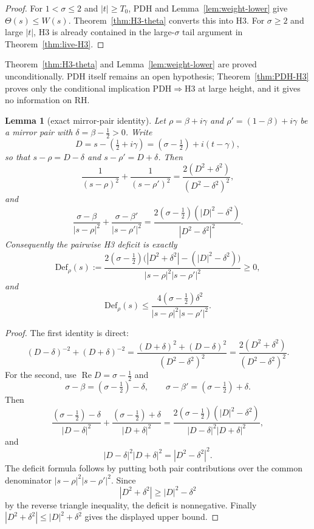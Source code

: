 \documentclass[11pt]{amsart}
\newtheorem{lemma}[theorem]{Lemma}
\theoremstyle{definition}
\theoremstyle{remark}
\theoremstyle{definition}
\renewcommand{\Re}{\operatorname{Re}}
\newcommand{\half}{\tfrac{1}{2}}
\begin{document}
\begin{proof}
For $1<\sigma\le2$ and $|t|\ge T_0$, PDH and Lemma~\ref{lem:weight-lower} give
$\Theta(s)\le W(s)$.  Theorem~\ref{thm:H3-theta} converts this into H3.  For $\sigma\ge2$ and large
$|t|$, H3 is already contained in the large-$\sigma$ tail argument in Theorem~\ref{thm:live-H3}.
\end{proof}

Theorem~\ref{thm:H3-theta} and Lemma~\ref{lem:weight-lower} are proved unconditionally. PDH itself remains
an open hypothesis; Theorem~\ref{thm:PDH-H3} proves only the conditional implication
$\mathrm{PDH}\Rightarrow\mathrm{H3}$ at large height, and it gives no information on RH.

\begin{lemma}[exact mirror-pair identity]\label{lem:mirror-exact}
Let $\rho=\beta+i\gamma$ and $\rho'=(1-\beta)+i\gamma$ be a mirror pair with
$\delta=\beta-\half>0$.  Write
\[
   D=s-(\half+i\gamma)=(\sigma-\half)+i(t-\gamma),
\]
so that $s-\rho=D-\delta$ and $s-\rho'=D+\delta$.  Then
\[
   \frac{1}{(s-\rho)^2}+\frac{1}{(s-\rho')^2}
   =
   \frac{2(D^2+\delta^2)}{(D^2-\delta^2)^2},
\]
and
\[
   \frac{\sigma-\beta}{|s-\rho|^2}
   +
   \frac{\sigma-\beta'}{|s-\rho'|^2}
   =
   \frac{2(\sigma-\half)(|D|^2-\delta^2)}{|D^2-\delta^2|^2}.
\]
Consequently the pairwise H3 deficit is exactly
\[
   \mathrm{Def}_\rho(s)
   :=
   \frac{
      2(\sigma-\half)\bigl(|D^2+\delta^2|-(|D|^2-\delta^2)\bigr)
   }{|s-\rho|^2|s-\rho'|^2}
   \ge0,
\]
and
\[
   \mathrm{Def}_\rho(s)
   \le
   \frac{4(\sigma-\half)\delta^2}{|s-\rho|^2|s-\rho'|^2}.
\]
\end{lemma}

\begin{proof}
The first identity is direct:
\[
   (D-\delta)^{-2}+(D+\delta)^{-2}
   =
   \frac{(D+\delta)^2+(D-\delta)^2}{(D^2-\delta^2)^2}
   =
   \frac{2(D^2+\delta^2)}{(D^2-\delta^2)^2}.
\]
For the second, use $\Re D=\sigma-\half$ and
\[
   \sigma-\beta=(\sigma-\half)-\delta,\qquad
   \sigma-\beta'=(\sigma-\half)+\delta.
\]
Then
\[
   \frac{(\sigma-\half)-\delta}{|D-\delta|^2}
   +
   \frac{(\sigma-\half)+\delta}{|D+\delta|^2}
   =
   \frac{2(\sigma-\half)(|D|^2-\delta^2)}
        {|D-\delta|^2|D+\delta|^2},
\]
and
\[
   |D-\delta|^2|D+\delta|^2=|D^2-\delta^2|^2.
\]
The deficit formula follows by putting both pair contributions over the common denominator
$|s-\rho|^2|s-\rho'|^2$.  Since
\[
   |D^2+\delta^2|\ge |D|^2-\delta^2
\]
by the reverse triangle inequality, the deficit is nonnegative.  Finally
$|D^2+\delta^2|\le |D|^2+\delta^2$ gives the displayed upper bound.
\end{proof}
\end{document}
